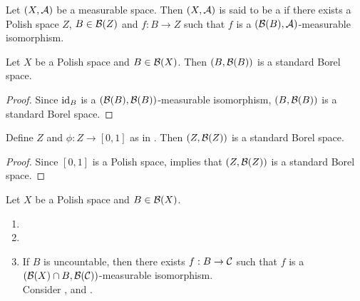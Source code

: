 \documentclass{book}
\begin{document}
	\begin{defn} 
		Let $(X, \mathcal{A})$ be a measurable space. Then $(X, \mathcal{A})$ is said to be a  if there exists a Polish space $Z$, $B \in \mathcal{B}(Z)$ and $f:B \rightarrow Z$ such that $f$ is a $(\mathcal{B}(B), \mathcal{A})$-measurable isomorphism.
	\end{defn}
	
	\begin{ex} 
		Let $X$ be a Polish space and $B \in \mathcal{B}(X)$. Then $(B, \mathcal{B}(B))$ is a standard Borel space.
	\end{ex}
	
	\begin{proof}
		Since $\operatorname{id}_B$ is a $(\mathcal{B}(B), \mathcal{B}(B))$-measurable isomorphism, $(B, \mathcal{B}(B))$ is a standard Borel space.
	\end{proof}
	
	\begin{ex} 
		Define $Z$ and $\phi: Z \rightarrow [0,1]$ as in . Then $(Z, \mathcal{B}(Z))$ is a standard Borel space.
	\end{ex}
	
	\begin{proof}
		Since $[0,1]$ is a Polish space,  implies that $(Z, \mathcal{B}(Z))$ is a standard Borel space.
	\end{proof}
	
	\begin{ex} 
		Let $X$ be a Polish space and $B \in \mathcal{B}(X)$. 
		\begin{enumerate}
			\item {} 
			\item {}
			\item If $B$ is uncountable, then there exists $f:B \rightarrow \mathcal{C}$ such that $f$ is a $(\mathcal{B}(X) \cap B, \mathcal{B}(\mathcal{C}))$-measurable isomorphism.  \\
			Consider ,
			\rex{}  and
			.
		\end{enumerate} 
	\end{ex}
	
\end{document}
